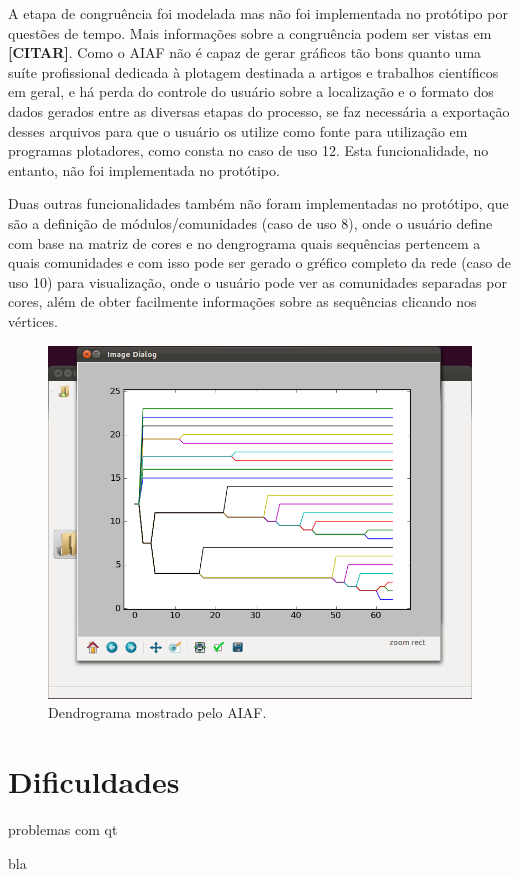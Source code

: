 A etapa de congruência foi modelada mas não foi implementada no protótipo por questões de tempo. Mais informações sobre a congruência podem
ser vistas em \textbf{[CITAR]}. Como o AIAF não é capaz de gerar gráficos tão bons quanto uma suíte profissional dedicada à plotagem destinada a artigos e
trabalhos científicos em geral, e há perda do controle do usuário sobre a localização e o formato dos dados gerados entre as diversas etapas do processo, se
faz necessária a exportação desses arquivos para que o usuário os utilize como fonte para utilização em programas plotadores, como consta no caso de uso
12. Esta funcionalidade, no entanto, não foi implementada no protótipo.

Duas outras funcionalidades também não foram implementadas no protótipo, que são a definição de módulos/comunidades (caso de uso 8), onde o usuário define
com base na matriz de cores e no dengrograma quais sequências pertencem a quais comunidades e com isso pode ser gerado o gréfico completo da rede (caso de
uso 10) para visualização, onde o usuário pode ver as comunidades separadas por cores, além de obter facilmente informações sobre as sequências clicando nos
vértices.

\begin{figure}
\centering
\includegraphics[scale=0.38]{navi-dendrogram}
\caption{Dendrograma mostrado pelo AIAF.}
\label{fig:navi-dendrogram}
\end{figure}

\section{Dificuldades} \label{sec:dificuldades}

problemas com qt

bla
